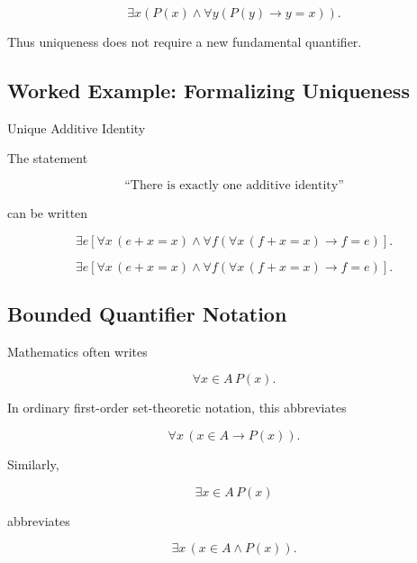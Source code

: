 \[
\boxed{
\exists x
\left(
P(x)
\land
\forall y
\left(
P(y)\rightarrow y=x
\right)
\right).
}
\]

Thus uniqueness does not require a new fundamental quantifier.

\subsection{Worked Example: Formalizing Uniqueness}
\label{subsec:worked-formalizing-uniqueness}

\begin{workedexamplebox}{Unique Additive Identity}

The statement

\[
\text{``There is exactly one additive identity''}
\]

can be written

\[
\exists e
\left[
\forall x
\,
(e+x=x)
\land
\forall f
\left(
\forall x\,(f+x=x)
\rightarrow
f=e
\right)
\right].
\]

\begin{answerbox}
\[
\boxed{
\exists e
\left[
\forall x\,(e+x=x)
\land
\forall f
\left(
\forall x\,(f+x=x)
\rightarrow
f=e
\right)
\right].
}
\]
\end{answerbox}

\end{workedexamplebox}

\subsection{Bounded Quantifier Notation}
\label{subsec:bounded-quantifier-notation}

Mathematics often writes

\[
\forall x\in A\,P(x).
\]

In ordinary first-order set-theoretic notation, this abbreviates

\[
\boxed{
\forall x
\,
(x\in A\rightarrow P(x)).
}
\]

Similarly,

\[
\exists x\in A\,P(x)
\]

abbreviates

\[
\boxed{
\exists x
\,
(x\in A\land P(x)).
}
\]

